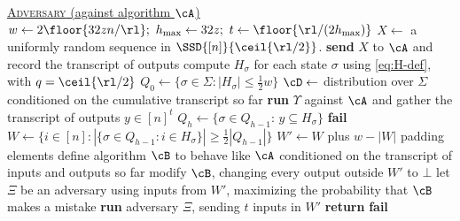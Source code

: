 \begin{itemize}
\begin{itemize}
\begin{algorithm}[!ht]
  \begin{algorithmic}[1]
    \Statex \underline{\textsc{Adversary} (against algorithm $\cA$)}
    \vspace{.5\baselineskip}
    \State $w \gets 2 \floor{32 z n/\rl};~ h_{\max} \gets 32 z;~ t \gets \floor{\rl/(2 h_{\max})}$
    \State $X \gets$ a uniformly random sequence in $\SSD{[n]}{\ceil{\rl/2}}$.\label{step:rt-pick-v}
    \State \textbf{send} $X$ to $\cA$ and record the transcript of outputs \label{step:rt-send-v}
    \State compute $H_\sigma$ for each state $\sigma$ using \cref{eq:H-def}, with $q = \ceil{\rl/2}$
    \State $Q_0 \gets \{\sigma \in \Sigma : |H_\sigma| \le \frac{1}{2} w\}$\label{step:rt-q0-def}
      \State $\cD \gets$ distribution over $\Sigma$ conditioned on the cumulative transcript so far
      \label{step:rt-pick-split-adv}
          \State \textbf{run} $\Upsilon$ against $\cA$ and gather the transcript of outputs $y \in [n]^t$ \label{step:rt-send-splitting}
          \State $Q_h \gets \{\sigma \in Q_{h-1}:\, y \subseteq H_\sigma\}$\label{step:rt-qh-def} 
           \textbf{fail} \label{step:rt-abort-qempty} \EndIf
      \Else
        \State $W \gets \{i \in [n]: |\{\sigma \in Q_{h-1} : i \in H_\sigma\}|
        \ge \frac{1}{2} |Q_{h-1}|\}$ \label{step:rt-wkp1-selection} 
        \State $W' \gets W$ plus $w - |W|$ padding elements
        \State define algorithm $\cB$ to behave like $\cA$ conditioned on the transcript of inputs and outputs so far
        \State modify $\cB$, changing every output outside $W'$ to $\bot$ \label{step:rt-modify-abort} 
        \State let $\Xi$ be an adversary using inputs from $W'$, maximizing the probability that $\cB$ makes a mistake \label{step:rt-pick-subadv}
        \Statex {}
        \State \textbf{run} adversary $\Xi$, sending $t$ inputs in $W'$\label{step:rt-run-subadv}
        \State \textbf{return} 
      \EndIf
    \EndFor
    \State \textbf{fail}\label{step:rt-abort-hmax}
  \end{algorithmic}
\end{algorithm}


\end{itemize}
\end{itemize}
